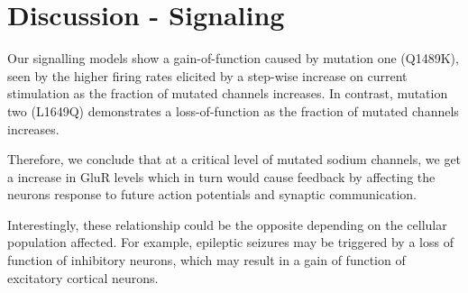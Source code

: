 \section{Discussion - Signaling}
Our signalling models show a gain-of-function caused by mutation one (Q1489K), seen by the higher
firing rates elicited by a step-wise increase on current stimulation as the fraction of mutated
channels increases. In contrast, mutation two (L1649Q) demonstrates a loss-of-function as the
fraction of mutated channels increases.

Therefore, we conclude that at a critical level of mutated sodium channels, we get a increase in
GluR levels which in turn would cause feedback by affecting the neurons response to future action
potentials and synaptic communication.

Interestingly, these relationship could be the opposite depending on the cellular
population affected. For example, epileptic seizures may be triggered by a loss of function of
inhibitory neurons, which may result in a gain of function of excitatory cortical neurons.

